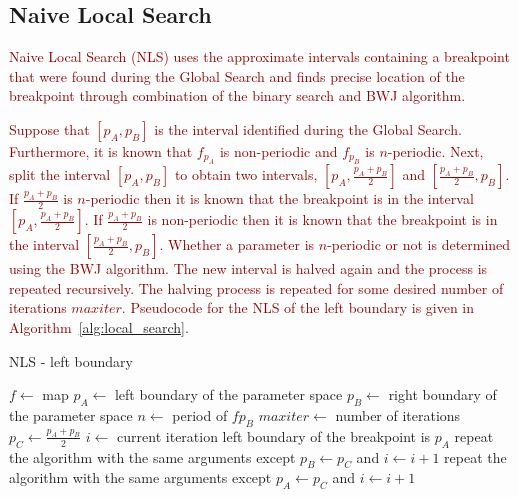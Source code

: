\subsection{Naive Local Search}
\label{subsec:naive_local_search}

\textcolor{darkred}{
Naive Local Search (NLS) uses the approximate intervals containing a breakpoint that were found during the Global Search and finds precise location of the breakpoint through combination of the binary search and BWJ algorithm.
}
\par
\textcolor{darkred}{
Suppose that $[p_{A}, p_{B}]$ is the interval identified during the Global Search.
Furthermore, it is known that $f_{p_{A}}$ is non-periodic and $f_{p_{B}}$ is $n$-periodic.
Next, split the interval $[p_{A}, p_{B}]$ to obtain two intervals, $[p_{A}, \frac{p_{A}+p_{B}}{2}]$ and $[\frac{p_{A}+p_{B}}{2}, p_{B}]$.
If $\frac{p_{A}+p_{B}}{2}$ is $n$-periodic then it is known that the breakpoint is in the interval $[p_{A}, \frac{p_{A}+p_{B}}{2}]$.
If $\frac{p_{A}+p_{B}}{2}$ is non-periodic then it is known that the breakpoint is in the interval $[\frac{p_{A}+p_{B}}{2}, p_{B}]$.
Whether a parameter is $n$-periodic or not is determined using the BWJ algorithm.
The new interval is halved again and the process is repeated recursively.
The halving process is repeated for some desired number of iterations $maxiter$.
Pseudocode for the NLS of the left boundary is given in Algorithm~\ref{alg:local_search}.
}

\begin{algorithm}[!h]
    \caption{NLS - left boundary}
    \label{alg:local_search}
    \begin{algorithmic}[1]
        \Statex $f \gets$ map
        \Statex $p_{A} \gets$ left boundary of the parameter space
        \Statex $p_{B} \gets$ right boundary of the parameter space
        \Statex $n \gets$ period of $f{p_{B}}$
        \Statex $maxiter \gets$ number of iterations
        \State $p_{C} \gets \frac{p_{A}+p_{B}}{2}$
        \State $i \gets$ current iteration
            \State left boundary of the breakpoint is $p_{A}$
        \EndIf
            \State repeat the algorithm with the same arguments except $p_{B} \gets p_{C}$ and $i \gets i+1$
        \Else
            \State repeat the algorithm with the same arguments except $p_{A} \gets p_{C}$ and $i \gets i+1$
        \EndIf
    \end{algorithmic}
\end{algorithm}

